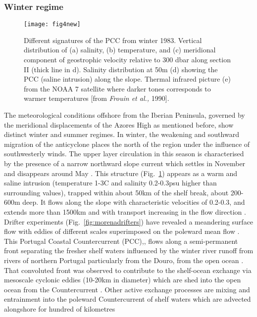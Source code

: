 \subsubsection{Winter regime}
\begin{figure}
  \centering
  \texttt{[image: fig4new]}
  \caption{Different signatures of the PCC from winter 1983.
  Vertical distribution of (a) salinity, (b) temperature, and (c)
  meridional component of geostrophic velocity relative to 300
  dbar along section II (thick line in d). Salinity distribution
  at 50m (d) showing the PCC (saline intrusion) along the slope.
  Thermal infrared picture (e) from the NOAA 7 satellite where
  darker tones corresponds to warmer temperatures [from {\it Frouin et
  al.,} 1990].}\label{fig:poleward}
\end{figure}
The meteorological conditions offshore from the Iberian Peninsula,
governed by the meridional displacements of the Azores High as
mentioned before, show distinct winter and summer regimes.  In
winter, the weakening and southward migration of the anticyclone
places the north of the region under the influence of
southwesterly winds. The upper layer circulation in this season is
characterised by the presence of a narrow northward slope current
which settles in November and disappears around May
\citep{Frouin90,Haynes90,Pingree92}. This structure
(Fig.~\ref{fig:poleward}) appears as a warm and saline intrusion
(temperature 1-3\deg C and salinity 0.2-0.3psu higher than
surrounding values), trapped within about 50km of the shelf break,
about 200-600m deep. It flows along the slope with characteristic
velocities of 0.2-0.3\vel, and extends more than 1500km and with
transport increasing in the flow direction
\citep{Frouin90,Haynes90}. Drifter experiments
(Fig.~\ref{fig:morenadrifters}) have revealed a meandering surface
flow with eddies of different scales superimposed on the poleward
mean flow \citep{Haynes91,Sena96}. This Portugal Coastal
Countercurrent (PCC),\citep{Fiuza97}, flows along a semi-permanent
front separating the fresher shelf waters influenced by the winter
river runoff from rivers of northern Portugal particularly from
the Douro, from the open ocean \citep{Hamann96}. That convoluted
front was observed to contribute to the shelf-ocean exchange via
mesoscale cyclonic eddies (10-20km in diameter) which are shed
into the open ocean from the Countercurrent
\citep{Fiuza96b,Perez01}. Other active exchange processes are
mixing and entrainment into the poleward Countercurrent of shelf
waters which are advected alongshore for hundred of kilometres
